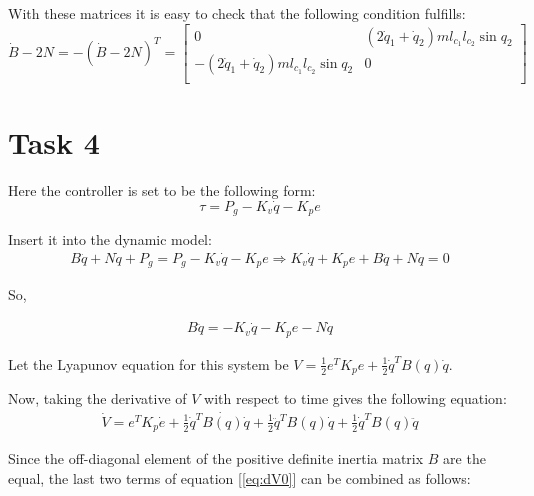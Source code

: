 \documentclass[a4paper,12pt,oneside,onecolumn]{article} %
\begin{document}
With these matrices it is easy to check that the following condition fulfills: 
\begin{equation} \label{eq:B-2N}
    \dot{B}-2N = -(\dot{B}-2N)^T = 
    \begin{bmatrix}
    0 & (2\dot{q}_1 + \dot{q}_2) m l_{c_1} l_{c_2} \sin{q_2} \\
    -(2\dot{q}_1 + \dot{q}_2) m l_{c_1} l_{c_2} \sin{q_2} & 0 \\
    \end{bmatrix}
\end{equation}



\section*{Task 4}
Here the controller is set to be the following form: 
\begin{equation}
    \tau = P_g - K_v \dot{q} - K_p e
\end{equation}

Insert it into the dynamic model: 
\begin{equation}\label{eq:cont}
\begin{aligned}
    B \ddot{q} + N \dot{q} + P_g = P_g - K_v \dot{q} - K_p e  \Rightarrow
    K_v \dot{q} + K_p e + B \ddot{q} + N \dot{q} = 0 
\end{aligned}
\end{equation}

So,

\begin{equation} \label{eq:Bq}
\begin{aligned}
     B \ddot{q}= -K_v \dot{q} - K_p e - N \dot{q}
\end{aligned}
\end{equation}

Let the Lyapunov equation for this system be $V = \frac{1}{2} e^T K_p e + \frac{1}{2} \dot{q}^T B(q) \dot{q}$. 

Now, taking the derivative of $V$ with respect to time gives the following equation: 
\begin{equation} \label{eq:dV0}
\begin{aligned}
\dot{V} = e^T K_p \dot{e} + \frac{1}{2} \dot{q}^T \dot {B(q)} \dot{q} + \frac{1}{2} \ddot{q}^T B(q) \dot{q} + \frac{1}{2} \dot{q}^T B(q) \ddot{q}
\end{aligned}
\end{equation} 

Since the off-diagonal element of the positive definite inertia matrix $B$ are the equal, the last two terms of equation [\ref{eq:dV0}] can be combined as follows: 
\end{document}
